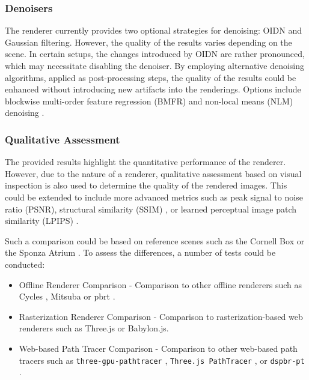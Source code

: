 \subsubsection*{Denoisers}

The renderer currently provides two optional strategies for denoising: \gls{OIDN} \cite{openImageDenoise} and Gaussian filtering. However, the quality of the results varies depending on the scene. In certain setups, the changes introduced by \gls{OIDN} are rather pronounced, which may necessitate disabling the denoiser. By employing alternative denoising algorithms, applied as post-processing steps, the quality of the results could be enhanced without introducing new artifacts into the renderings. Options include blockwise multi-order feature regression (BMFR) \cite{blockwise-multi-order-regresssion-for-rt-pt} and non-local means (NLM) denoising \cite{buadesNLMDenoising}.

\subsubsection*{Qualitative Assessment}

The provided results highlight the quantitative performance of the renderer. However, due to the nature of a renderer, qualitative assessment based on visual inspection is also used to determine the quality of the rendered images. This could be extended to include more advanced metrics such as peak signal to noise ratio (PSNR), structural similarity (SSIM) \cite{ssim}, or learned perceptual image patch similarity (LPIPS) \cite{lpips}.

Such a comparison could be based on reference scenes such as the Cornell Box \cite{goral1984modeling} or the Sponza Atrium \cite{dabrovic2002sponza}. To assess the differences, a number of tests could be conducted:

\begin{itemize}
    \item{Offline Renderer Comparison} - Comparison to other offline renderers such as Cycles \cite{cycles}, Mitsuba \cite{Jakob2020DrJit} or \gls{pbrt} \cite{Pharr_Physically_Based_Rendering_2023}.
    \item{Rasterization Renderer Comparison} - Comparison to rasterization-based web renderers such as \gls{Three.js} or \gls{Babylon.js}.
    \item{Web-based Path Tracer Comparison} - Comparison to other web-based path tracers such as \texttt{three-gpu-pathtracer} \cite{ThreeJsPathTracerJohnson}, \texttt{Three.js PathTracer} \cite{ThreeJsPathTracerLoftis}, or \texttt{dspbr-pt} \cite{PathTracerDassault}.
\end{itemize}

